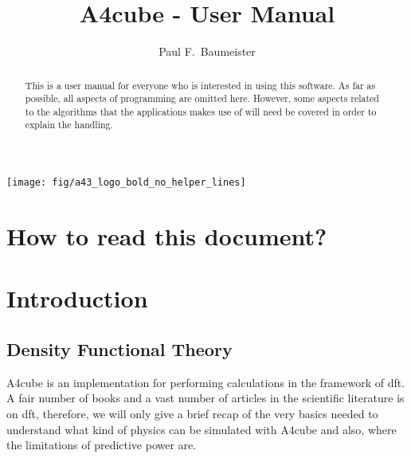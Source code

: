 \documentclass[oribibl]{llncs}
\newcommand{\codename}{A4cube}
\begin{document}
\pagestyle{plain}

\title       {\codename{} - User Manual}
\titlerunning{\codename{}}

\author{%
  Paul F.~Baumeister %
}


\maketitle

\begin{figure*}
	\centering
	\texttt{[image: fig/a43\_logo\_bold\_no\_helper\_lines]} %
\end{figure*}

\begin{abstract}
This is a user manual for everyone who is interested in using
this software.
As far as possible, all aspects of programming are omitted here.
However, some aspects related to the algorithms that the applications 
makes use of will need be covered in order to explain the handling.
\end{abstract}

\section*{How to read this document?}

\newpage
\section{Introduction} \label{sec:intro}
%
\subsection{Density Functional Theory}
\codename{} is an implementation for performing calculations in the framework of \ac{dft}.
A fair number of books and a vast number of articles in the scientific 
literature is on \ac{dft}, therefore, we will only give a brief recap 
of the very basics needed to understand what kind of physics can be
simulated with \codename{} and also, where the limitations of predictive power
are.
\end{document}

